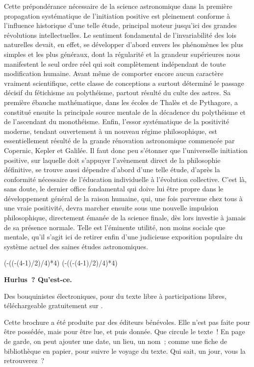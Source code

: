 \documentclass[french,twoside]{book} %
\def\truncdiv#1#2{((#1-(#2-1)/2)/#2)}
\def\moduloop#1#2{(#1-\truncdiv{#1}{#2}*#2)}
\def\modulo#1#2{\number\numexpr\moduloop{#1}{#2}\relax}
\begin{document}
Cette prépondérance nécessaire de la science astronomique dans la première propagation systématique de l’initiation positive est pleinement conforme à l’influence historique d’une telle étude, principal moteur jusqu’ici des grandes révolutions intellectuelles. Le sentiment fondamental de l’invariabilité des lois naturelles devait, en effet, se développer d’abord envers les phénomènes les plus simples et les plus généraux, dont la régularité et la grandeur supérieures nous manifestent le seul ordre réel qui soit complètement indépendant de toute modification humaine. Avant même de comporter encore aucun caractère vraiment scientifique, cette classe de conceptions a surtout déterminé le passage décisif du fétichisme au polythéisme, partout résulté du culte des astres. Sa première ébauche mathématique, dans les écoles de Thalès et de Pythagore, a constitué ensuite la principale source mentale de la décadence du polythéisme et de l’ascendant du monothéisme. Enfin, l’essor systématique de la positivité moderne, tendant ouvertement à un nouveau régime philosophique, est essentiellement résulté de la grande rénovation astronomique commencée par Copernic, Kepler et Galilée. Il faut donc peu s’étonner que l’universelle initiation positive, sur laquelle doit s’appuyer l’avènement direct de la philosophie définitive, se trouve aussi dépendre d’abord d’une telle étude, d’après la conformité nécessaire de l’éducation individuelle à l’évolution collective. C’est là, sans doute, le dernier office fondamental qui doive lui être propre dans le développement général de la raison humaine, qui, une fois parvenue chez tous à une vraie positivité, devra marcher ensuite sous une nouvelle impulsion philosophique, directement émanée de la science finale, dès lors investie à jamais de sa présence normale. Telle est l’éminente utilité, non moins sociale que mentale, qu’il s’agit ici de retirer enfin d’une judicieuse exposition populaire du système actuel des saines études astronomiques.
 


\ifbooklet
  \pagestyle{empty}
  \clearpage
  \ifnum\modulo{\value{page}}{4}=0 \hbox{}\newpage\hbox{}\newpage\fi
  \ifnum\modulo{\value{page}}{4}=1 \hbox{}\newpage\hbox{}\newpage\fi


  \hbox{}\newpage
  \ifodd\value{page}\hbox{}\newpage\fi
  {\centering\color{rubric}\bfseries\noindent\large
    Hurlus ? Qu’est-ce.\par
    \bigskip
  }
  \noindent Des bouquinistes électroniques, pour du texte libre à participations libres,
  téléchargeable gratuitement sur \href{https://hurlus.fr}{}.\par
  \bigskip
  \noindent Cette brochure a été produite par des éditeurs bénévoles.
  Elle n’est pas faite pour être possédée, mais pour être lue, et puis donnée.
  Que circule le texte !
  En page de garde, on peut ajouter une date, un lieu, un nom ;
  comme une fiche de bibliothèque en papier,
  pour suivre le voyage du texte. Qui sait, un jour, vous la retrouverez ?
  \par
\end{document}
